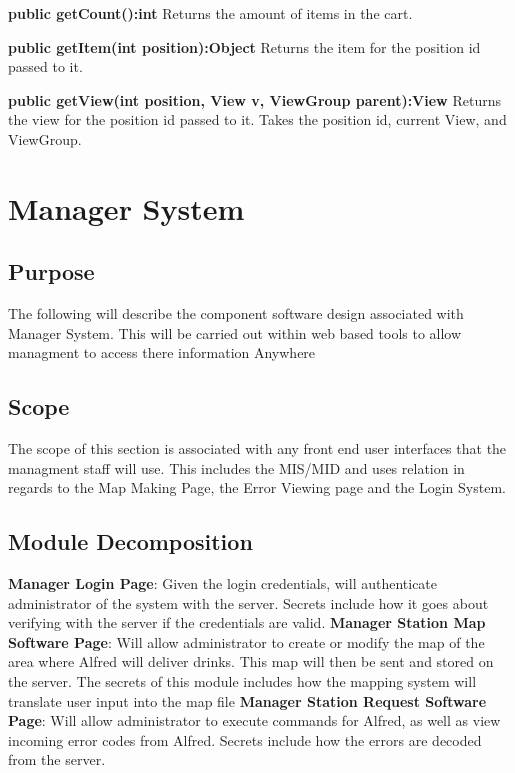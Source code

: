 \documentclass [10pt]{article}
\begin{document}
\textbf{public getCount():int}
Returns the amount of items in the cart.

\textbf{public getItem(int position):Object}
Returns the item for the position id passed to it.

\textbf{public getView(int position, View v, ViewGroup parent):View}
Returns the view for the position id passed to it. Takes the position id, current View, and ViewGroup.


\section {Manager System}


\subsection{Purpose}
The following will describe the component software design associated with Manager System. This will be carried out within web based tools to allow managment to access there information Anywhere

\subsection{Scope}

The scope of this section is associated with any front end user interfaces that the managment staff will use. This includes the MIS/MID and uses relation in regards to the Map Making Page, the Error Viewing page and the Login System. 

\subsection{Module Decomposition}

\textbf{Manager Login Page}: Given the login credentials, will authenticate administrator of the system with the server. Secrets include how it goes about verifying with the server if the credentials are valid.
\textbf{Manager Station Map Software Page}: Will allow administrator to create or modify the map of the area where Alfred will deliver drinks. This map will then be sent and stored on the server. The secrets of this module includes how the mapping system will translate user input into the map file
\textbf{Manager Station Request Software Page}: Will allow administrator to execute commands for Alfred, as well as view incoming error codes from Alfred. Secrets include how the errors are decoded from the server.
\end{document}
